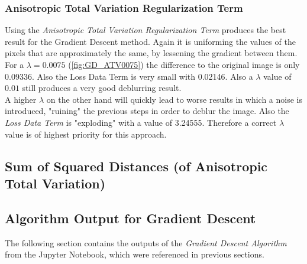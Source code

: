 \documentclass{report}
\begin{document}
			\subsubsection{Anisotropic Total Variation Regularization Term}
			\startsubsection
				Using the \textit{Anisotropic Total Variation Regularization Term} produces the best result for the Gradient Descent method. Again it is uniforming the values of the pixels that are approximately the same, by lessening the gradient between them. For a $\lambda = 0.0075$ (\ref{fig:GD_ATV0075}) the difference to the original image is only 0.09336. Also the Loss Data Term is very small with 0.02146. Also a $\lambda$ value of $0.01$ still produces a very good deblurring result. \\
				A higher $\lambda$ on the other hand will quickly lead to worse results in which a noise is introduced, "ruining" the previous steps in order to deblur the image. Also the \textit{Loss Data Term} is "exploding" with a value of 3.24555. Therefore a correct $\lambda$ value is of highest priority for this approach.
			\closesection
		\closesection
		\subsection{Sum of Squared Distances (of Anisotropic Total Variation)}
		\startsubsection
		\closesection
		
		\newpage
		\subsection*{Algorithm Output for Gradient Descent}
		\startsubsection
			The following section contains the outputs of the \textit{Gradient Descent Algorithm} from the Jupyter Notebook, which were referenced in previous sections.
\end{document}
